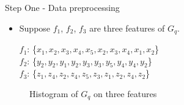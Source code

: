\documentclass[
size=14pt,
paper=smartboard,  %
mode=present, 		%
display=slides, 	%
style=tuliplab,  	%
pauseslide,
fleqn,leqno]{powerdot}
\begin{document}
	
	\begin{slide}{Step One - Data preprocessing}
	\begin{itemize}
		\item
		\smallskip
		Suppose $f_1$, $f_2$, $f_3$ are three features of $G_q$.
		
		$f_1$: \{$x_1, x_2, x_3, x_4, x_5, x_2, x_3, x_4, x_1, x_2$\} \\
		
		$f_2$: \{$y_2, y_2, y_1, y_2, y_3, y_3, y_5, y_4, y_4, y_2$\} \\
		
		$f_3$: \{$z_1, z_4, z_2, z_4, z_5, z_3, z_1, z_2, z_4, z_2$\} \\
	\end{itemize}
	
	\begin{figure}[htbp]
		\centering
		\caption{Histogram of $G_q$ on three features}
		\label{fig:fre-dis-each-feature}
	\end{figure}
	
\end{slide}
\end{document}
